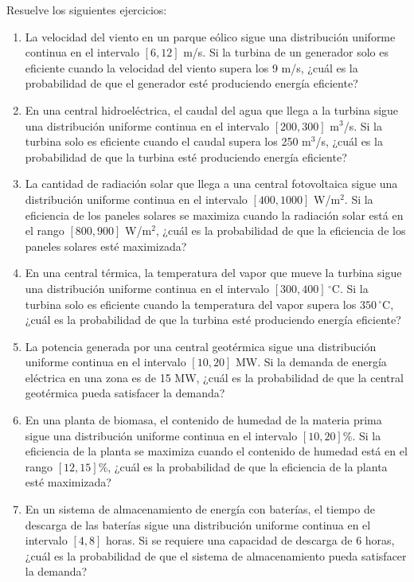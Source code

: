 \begin{Ejer}
Resuelve los siguientes ejercicios:
\begin{enumerate}

    \item La velocidad del viento en un parque eólico sigue una distribución uniforme continua en el intervalo $[6, 12]$ m/s. Si la turbina de un generador solo es eficiente cuando la velocidad del viento supera los 9 m/s, ¿cuál es la probabilidad de que el generador esté produciendo energía eficiente?

    \item En una central hidroeléctrica, el caudal del agua que llega a la turbina sigue una distribución uniforme continua en el intervalo $[200, 300]$ m$^3$/s. Si la turbina solo es eficiente cuando el caudal supera los 250 m$^3$/s, ¿cuál es la probabilidad de que la turbina esté produciendo energía eficiente?

    \item La cantidad de radiación solar que llega a una central fotovoltaica sigue una distribución uniforme continua en el intervalo $[400, 1000]$ W/m$^2$. Si la eficiencia de los paneles solares se maximiza cuando la radiación solar está en el rango $[800, 900]$ W/m$^2$, ¿cuál es la probabilidad de que la eficiencia de los paneles solares esté maximizada?

    \item En una central térmica, la temperatura del vapor que mueve la turbina sigue una distribución uniforme continua en el intervalo $[300, 400]\,^\circ$C. Si la turbina solo es eficiente cuando la temperatura del vapor supera los $350\,^\circ$C, ¿cuál es la probabilidad de que la turbina esté produciendo energía eficiente?

    \item La potencia generada por una central geotérmica sigue una distribución uniforme continua en el intervalo $[10, 20]$ MW. Si la demanda de energía eléctrica en una zona es de 15 MW, ¿cuál es la probabilidad de que la central geotérmica pueda satisfacer la demanda?

    \item En una planta de biomasa, el contenido de humedad de la materia prima sigue una distribución uniforme continua en el intervalo $[10, 20]$\%. Si la eficiencia de la planta se maximiza cuando el contenido de humedad está en el rango $[12, 15]$\%, ¿cuál es la probabilidad de que la eficiencia de la planta esté maximizada?

    \item En un sistema de almacenamiento de energía con baterías, el tiempo de descarga de las baterías sigue una distribución uniforme continua en el intervalo $[4, 8]$ horas. Si se requiere una capacidad de descarga de 6 horas, ¿cuál es la probabilidad de que el sistema de almacenamiento pueda satisfacer la demanda?


\end{enumerate}
\end{Ejer}
